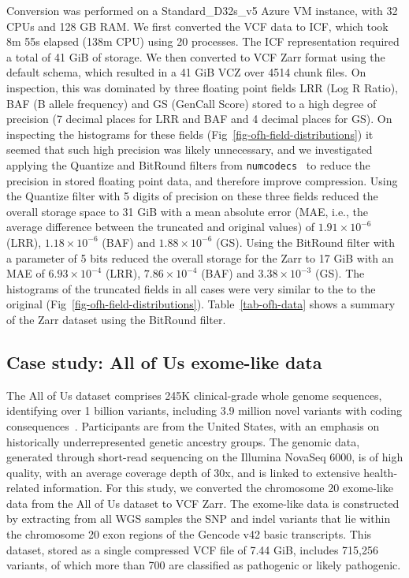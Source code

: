 \documentclass[a4paper,num-refs]{oup-contemporary}
\begin{document}
Conversion was performed on a Standard\_D32s\_v5 Azure VM instance, with 
32 CPUs and 128 GB RAM. We first converted the VCF
data to ICF, which took 8m 55s elapsed (138m CPU) using 20 processes.
The ICF representation required a total of 41 GiB of storage.
We then converted to VCF Zarr format using the default schema, which resulted
in a 41 GiB VCZ over 4514 chunk files. 
On inspection, this was dominated by three floating point
fields LRR (Log R Ratio), BAF (B allele frequency) and GS (GenCall Score)
stored
to a high degree of precision (7 decimal places for LRR and BAF and 4 decimal
places for GS).
On inspecting the histograms for these fields
(Fig~\ref{fig-ofh-field-distributions}) it seemed that such high precision
was likely unnecessary, and we investigated applying the Quantize
and BitRound filters from \texttt{numcodecs}~\citep{numcodecs}
to reduce the precision in stored floating point data,
and therefore improve compression.
Using the Quantize filter with 5 digits of precision on these three fields reduced the
overall storage space to 31 GiB with a mean absolute error (MAE, i.e., the average
difference between the truncated and original values) of
$1.91\times10^{-6}$ (LRR),
$1.18\times10^{-6}$ (BAF)  and
$1.88\times10^{-6}$ (GS).
Using the BitRound filter with a parameter of 5 bits reduced the overall storage for the Zarr to
17 GiB with an MAE of
$6.93\times10^{-4}$ (LRR),
$7.86\times10^{-4}$ (BAF)  and
$3.38\times10^{-3}$ (GS).
The histograms of the truncated fields in all cases were very similar to the
to the original (Fig~\ref{fig-ofh-field-distributions}).
Table~\ref{tab-ofh-data} shows a summary of the Zarr dataset using the 
BitRound filter.

\subsection{Case study: All of Us exome-like data}
The All of Us dataset comprises 245K clinical-grade whole genome sequences,
identifying over 1 billion variants, including 3.9 million novel variants
with coding consequences~\citep{all2024genomic}. 
Participants are from the United States,
with an emphasis on historically underrepresented genetic ancestry groups.
The genomic data, generated through short-read sequencing on the Illumina NovaSeq 6000,
is of high quality, with an average coverage depth of 30x, and is linked to extensive
health-related information.
For this study, we converted the chromosome 20 exome-like
data from the All of Us dataset to VCF Zarr.
The exome-like data is constructed by extracting from all WGS samples
the SNP and indel variants that lie within the 
chromosome 20 exon regions of the Gencode v42 basic
transcripts. This dataset, stored as a single compressed VCF file of 7.44 GiB,
includes 715,256 variants, of which more than 700 are classified as 
pathogenic or likely pathogenic.
\end{document}

